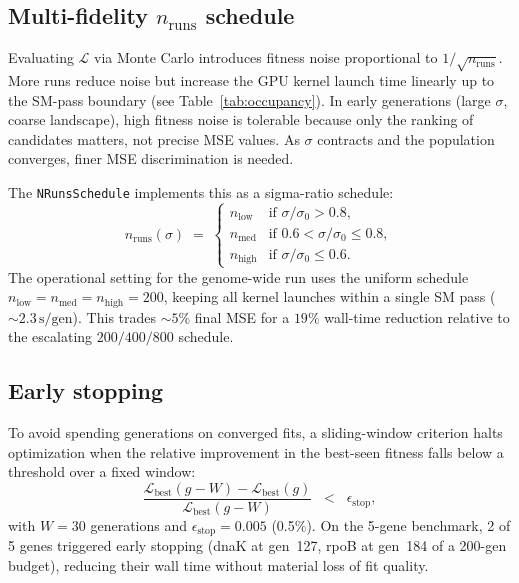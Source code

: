 \documentclass[11pt]{article}
\begin{document}
\subsection{Multi-fidelity $n_{\text{runs}}$ schedule}

Evaluating $\mathcal{L}$ via Monte Carlo introduces fitness noise proportional
to $1/\sqrt{n_{\text{runs}}}$. More runs reduce noise but increase the GPU
kernel launch time linearly up to the SM-pass boundary (see Table~\ref{tab:occupancy}).
In early generations (large $\sigma$, coarse landscape), high fitness noise is
tolerable because only the ranking of candidates matters, not precise MSE values.
As $\sigma$ contracts and the population converges, finer MSE discrimination is
needed.

The \texttt{NRunsSchedule} implements this as a sigma-ratio schedule:
\begin{equation}
  n_{\text{runs}}(\sigma) \;=\;
  \begin{cases}
    n_{\text{low}}  & \text{if } \sigma/\sigma_0 > 0.8, \\
    n_{\text{med}}  & \text{if } 0.6 < \sigma/\sigma_0 \le 0.8, \\
    n_{\text{high}} & \text{if } \sigma/\sigma_0 \le 0.6.
  \end{cases}
\end{equation}
The operational setting for the genome-wide run uses the uniform schedule
$n_{\text{low}} = n_{\text{med}} = n_{\text{high}} = 200$, keeping all kernel
launches within a single SM pass ($\sim 2.3\,\text{s/gen}$). This trades
$\sim 5\%$ final MSE for a $19\%$ wall-time reduction relative to the
escalating $200/400/800$ schedule.

\subsection{Early stopping}

To avoid spending generations on converged fits, a sliding-window criterion
halts optimization when the relative improvement in the best-seen fitness falls
below a threshold over a fixed window:
\begin{equation}
  \frac{\mathcal{L}_{\text{best}}(g - W) - \mathcal{L}_{\text{best}}(g)}
       {\mathcal{L}_{\text{best}}(g - W)}
  \;\;<\;\; \epsilon_{\text{stop}},
\end{equation}
with $W = 30$ generations and $\epsilon_{\text{stop}} = 0.005$ (0.5\%).
On the 5-gene benchmark, 2 of 5 genes triggered early stopping (dnaK at
gen~127, rpoB at gen~184 of a 200-gen budget), reducing their wall time
without material loss of fit quality.
\end{document}
